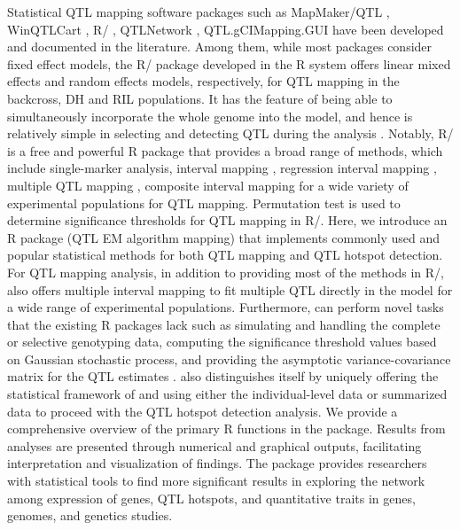 Statistical QTL mapping software packages such as MapMaker/QTL \citep{Lincoln-1993}, WinQTLCart \citep{Wang-2000}, R/ \citep{Broman-2003}, QTLNetwork \citep{Yang-2008, Taylor-2011, Verbyla-2012}, QTL.gCIMapping.GUI \citep{Zhang-2020} have been developed and documented in the literature. Among them, while most packages consider fixed effect models, the R/ package developed in the R system offers linear mixed effects and random effects models, respectively, for QTL mapping in the backcross, DH and RIL populations. It has the feature of being able to simultaneously incorporate the whole genome into the model, and hence is relatively simple in selecting and detecting QTL during the analysis \citep{Taylor-2011}. Notably, R/ is a free and powerful R package that provides a broad range of methods, which include single-marker analysis, interval mapping \citep{Lander-1989}, regression interval mapping \citep{Haley-1992}, multiple QTL mapping \citep{Jansen-1993},  composite interval mapping \citep{Zeng-1994} for a wide variety of experimental populations for QTL mapping. Permutation test \citep{Churchill-1994} is used to determine significance thresholds for QTL mapping in R/. Here, we introduce an R package  (QTL EM algorithm mapping) that implements commonly used and popular statistical methods for both QTL mapping and QTL hotspot detection. For QTL mapping analysis, in addition to providing most of the methods in R/,   also offers multiple interval mapping \citep{Kao-1999} to fit multiple QTL directly in the model for a wide range of experimental populations. Furthermore,  can perform novel tasks that the existing R packages lack such as simulating and handling the complete or selective genotyping data, computing the significance threshold values based on Gaussian stochastic process, and providing the asymptotic variance-covariance matrix for the QTL estimates \citep{Kao-1997, Kao-2012, Lee-2014}.  also distinguishes itself by uniquely offering the statistical framework of \citet{Yang-2019} and \citet{Wu-2021} using either the individual-level data or summarized data to proceed with the QTL hotspot detection analysis. We provide a comprehensive overview of the primary R functions in the  package. Results from analyses are presented through numerical and graphical outputs, facilitating interpretation and visualization of findings. The  package provides researchers with statistical tools to find more significant results in exploring the network among expression of genes, QTL hotspots, and quantitative traits in genes, genomes, and genetics studies.

